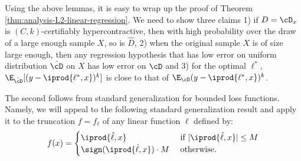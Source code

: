 {\begin{lemma}
\end{lemma}


Using the above lemmas, it is easy to wrap up the proof of Theorem \ref{thm:analysis-L2-linear-regression}. We need to show three claims 1) if $D = \cD_x$ is $(C,k)$-certifiably hypercontractive, then with high probability over the draw of a large enough sample $X$,  so is $\hat{D}$, 2) when the original sample $X$ is of size large enough, then any regression hypothesis that has low error on uniform distribution $\hat{\cD}$ on $X$ has low error on $\cD$ and 3) for the optimal $\ell^{*}$, $\E_{\hat{\cD}}[ (y - \iprod{\ell^{*},x})^k]$ is close to that of $\E_{\cD} (y - \iprod{\ell^{*},x})^k$. 




The second follows from standard generalization for bounded loss functions. Namely, we will appeal to the following standard generalization result and apply it to the truncation $f = f_{\ell}$ of any linear function $\ell$ defined by:
\[
f (x) = \begin{cases} \iprod{\hat{\ell},x} & \text{ if } |\iprod{\hat{\ell},x}| \leq M \\
       \sign(\iprod{\hat{\ell},x}) \cdot M & \text{ otherwise.}
       \end{cases}
\]

}
